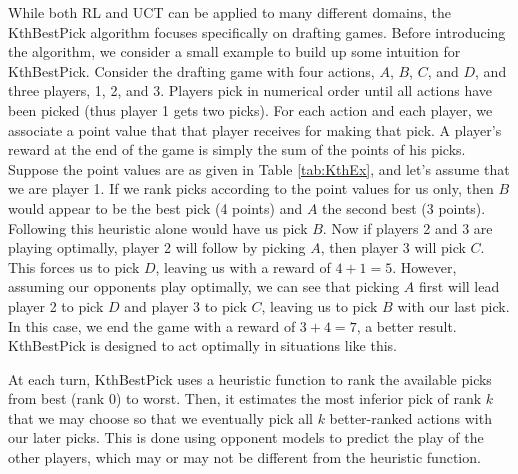 \documentclass[letterpaper]{article}
\numberwithin{equation}{section}
\numberwithin{theorem}{section}
\numberwithin{lemma}{section}
\numberwithin{df}{section}
\begin{document}
While both RL and UCT can be applied to many different domains, the KthBestPick algorithm focuses specifically on drafting games.  Before introducing the algorithm, we consider a small example to build up some intuition for KthBestPick.  Consider the drafting game with four actions, $A$, $B$, $C$, and $D$, and three players, 1, 2, and 3.  Players pick in numerical order until all actions have been picked (thus player 1 gets two picks).  For each action and each player, we associate a point value that that player receives for making that pick.  A player's reward at the end of the game is simply the sum of the points of his picks.  Suppose the point values are as given in Table \ref{tab:KthEx}, and let's assume that we are player 1.  If we rank picks according to the point values for us only, then $B$ would appear to be the best pick (4 points) and $A$ the second best (3 points).  Following this heuristic alone would have us pick $B$.  Now if players 2 and 3 are playing optimally, player 2 will follow by picking $A$, then player 3 will pick $C$.  This forces us to pick $D$, leaving us with a reward of $4 + 1 = 5$.  However, assuming our opponents play optimally, we can see that picking $A$ first will lead player 2 to pick $D$ and player 3 to pick $C$, leaving us to pick $B$ with our last pick.  In this case, we end the game with a reward of $3 + 4 = 7$, a better result.  KthBestPick is designed to act optimally in situations like this.

At each turn, KthBestPick uses a heuristic function to rank the available picks from best (rank 0) to worst.  Then, it estimates the most inferior pick of rank $k$ that we may choose so that we eventually pick all $k$ better-ranked actions with our later picks.  This is done using opponent models to predict the play of the other players, which may or may not be different from the heuristic function.
\end{document}
